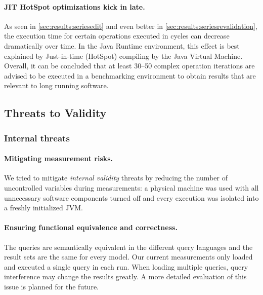 \paragraph{JIT HotSpot optimizations kick in late.}
As seen in \autoref{sec:results:seriesedit} and even better in \autoref{sec:results:seriesrevalidation}, the execution time for certain operations executed in cycles can decrease dramatically over time. In the Java Runtime environment, this effect is best explained by Just-in-time (HotSpot) compiling by the Java Virtual Machine. Overall, it can be concluded that at least 30--50 complex operation iterations are advised to be executed in a benchmarking environment to obtain results that are relevant to long running software.

\subsection{Threats to Validity}

\subsubsection{Internal threats}

\paragraph{Mitigating measurement risks.}
We tried to mitigate \emph{internal validity} threats by reducing the number of
uncontrolled variables during measurements: a physical machine was used with all
unnecessary software components turned off and every execution was isolated into
a freshly initialized JVM.

\paragraph{Ensuring functional equivalence and correctness.}
The queries are semantically equivalent in the different query languages and the
result sets are the same for every model. 
Our current measurements only loaded and executed a single query in each run.
When loading multiple queries, query interference may change the results
greatly. A more detailed evaluation of this issue is planned for the future.



